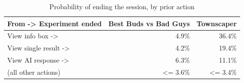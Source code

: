 \begin{table}[t]
\centering
\caption{Probability of ending the session, by prior action}
\label{tab:rq2-exit-probabilities}
\begin{tabular}{lrr}
\toprule
From -> Experiment ended & Best Buds vs Bad Guys & Townscaper \\
\midrule
View info box -> & 4.9\% & 36.4\% \\
View single result -> & 4.2\% & 19.4\% \\
View AI response -> & 6.3\% & 11.1\% \\
(all other actions) & <= 3.6\% & <= 3.4\% \\
\bottomrule
\end{tabular}
\end{table}
